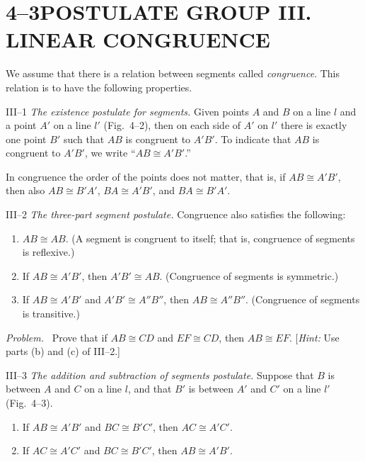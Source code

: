 \documentclass[11pt]{book}
\theoremstyle{bkplain}
\newenvironment{IVproblem}{\par\medskip\noindent\emph{Problem.}\ }{\par\medskip}
\theoremstyle{XIplainnote}
\theoremstyle{bkplain}
\theoremstyle{bkplain}
\begin{document}
\section*{4--3\quad POSTULATE GROUP III. LINEAR CONGRUENCE}

We assume that there is a relation between segments called \emph{congruence}.
This relation is to have the following properties.

III--1 \emph{The existence postulate for segments.} Given points $A$ and $B$ on a
line $l$ and a point $A'$ on a line $l'$ (Fig.~4--2), then on each side of $A'$
on $l'$ there is exactly one point $B'$ such that $AB$ is congruent to $A'B'$. To
indicate that $AB$ is congruent to $A'B'$, we write ``$AB \cong A'B'$.''

\FIGIVTWOTHREE

In congruence the order of the points does not matter, that is, if
$AB \cong A'B'$, then also $AB \cong B'A'$, $BA \cong A'B'$, and
$BA \cong B'A'$.

III--2 \emph{The three-part segment postulate.} Congruence also satisfies the
following:

\begin{enumerate}[label=(\alph*), leftmargin=2.2em, itemsep=2pt, topsep=3pt]
\item $AB \cong AB$. (A segment is congruent to itself; that is, congruence of
      segments is reflexive.)
\item If $AB \cong A'B'$, then $A'B' \cong AB$. (Congruence of segments is
      symmetric.)
\item If $AB \cong A'B'$ and $A'B' \cong A''B''$, then $AB \cong A''B''$.
      (Congruence of segments is transitive.)
\end{enumerate}

\begin{IVproblem}
Prove that if $AB \cong CD$ and $EF \cong CD$, then $AB \cong EF$.
[\emph{Hint:} Use parts (b) and (c) of III--2.]
\end{IVproblem}

III--3 \emph{The addition and subtraction of segments postulate.} Suppose that
$B$ is between $A$ and $C$ on a line $l$, and that $B'$ is between $A'$ and $C'$
on a line $l'$ (Fig.~4--3).

\begin{enumerate}[label=(\alph*), leftmargin=2.2em, itemsep=1pt, topsep=3pt]
\item If $AB \cong A'B'$ and $BC \cong B'C'$, then $AC \cong A'C'$.
\item If $AC \cong A'C'$ and $BC \cong B'C'$, then $AB \cong A'B'$.
\end{enumerate}
\end{document}

